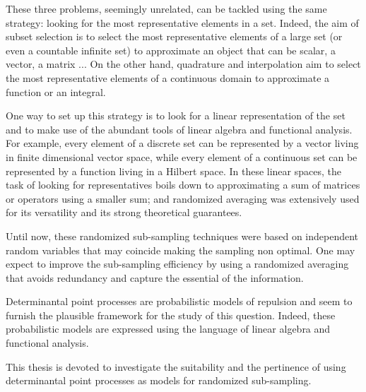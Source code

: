 \documentclass[twoside,11pt]{book}
\numberwithin{theorem}{chapter}
\numberwithin{definition}{chapter}
\numberwithin{proposition}{chapter}
\numberwithin{corollary}{chapter}
\numberwithin{example}{chapter}
\numberwithin{lemma}{chapter}
\numberwithin{assumption}{chapter}
\numberwithin{equation}{chapter}
\numberwithin{figure}{chapter}
\begin{document}
These three problems, seemingly unrelated, can be tackled using the same strategy: looking for the most representative elements in a set. Indeed,
the aim of subset selection is to select the most representative elements of a large set (or even a countable infinite set) to approximate an object that can be scalar, a vector, a matrix ... On the other hand, quadrature and interpolation aim to select the most representative elements of a continuous domain to approximate a function or an integral.


One way to set up this strategy is to look for a linear representation of the set and to make use of the abundant tools of linear algebra and functional analysis. For example, every element of a discrete set can be represented by a vector living in finite dimensional vector space, while every element of a continuous set can be represented by a function living in a Hilbert space. In these linear spaces, the task of looking for representatives boils down to approximating a sum of matrices or operators using a smaller sum; and randomized averaging was extensively used for its versatility and its strong theoretical guarantees. 


Until now, these randomized sub-sampling techniques were based on independent random variables that may coincide making the sampling non optimal. One may expect to improve the sub-sampling efficiency by using a randomized averaging that avoids redundancy and capture the essential of the information.


Determinantal point processes are probabilistic models of repulsion and seem to furnish the plausible framework for the study of this question. Indeed, these probabilistic models are expressed using the language of linear algebra and functional analysis.



This thesis is devoted to investigate the suitability and the pertinence of using determinantal point processes as models for randomized sub-sampling.

\end{document}
